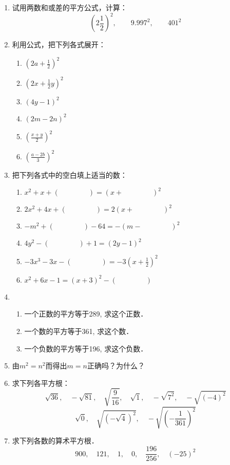 \begin{enumerate}
    \item 试用两数和或差的平方公式，计算：
\[\left(2\frac{1}{2}\right)^2,\qquad 9.997^2,\qquad 401^2\]
    \item 利用公式，把下列各式展开：
\begin{multicols}{2}
\begin{enumerate}
    \item $\left(2a+\frac{1}{2}\right)^2$
    \item $\left(2x+\frac{1}{2}y\right)^2$
    \item $(4y-1)^2$
    \item $(2m-2n)^2$
    \item $\left(\frac{x+y}{2}\right)^2$
    \item $\left(\frac{a-2b}{3}\right)^2$
\end{enumerate}
\end{multicols}
    \item 把下列各式中的空白填上适当的数：
\begin{enumerate}
    \item $x^2+x+(\qquad\qquad  )=(x+\qquad\qquad  )^2$
    \item $2x^2+4x+(\qquad\qquad   )=2(x+\qquad\qquad  )^2$
    \item $-m^2+(\qquad\qquad   )-64=-(m-\qquad\qquad  )^2$
    \item $4y^2-(\qquad\qquad  )+1=(2y-1)^2$
    \item $-3x^3-3x-(\qquad\qquad  )=-3\left(x+\frac{1}{2}\right)^2$
    \item $x^2+6x-1=(x+3)^2-(\qquad\qquad   )$
\end{enumerate}
    \item \begin{enumerate}
        \item 一个正数的平方等于289, 求这个正数．
        \item 一个数的平方等于361, 求这个数．
        \item 一个负数的平方等于196, 求这个负数．
    \end{enumerate}
    
\item 由$m^2=n^2$而得出$m=n$正确吗？为什么？
\item 求下列各平方根：
\[\sqrt{36},\quad -\sqrt{81},\quad \sqrt{\frac{9}{16}},\quad \sqrt{1},\quad -\sqrt{7^2},\quad -\sqrt{(-4)^2}\]
\[\sqrt{0},\quad \sqrt{(-\sqrt{4})^2},\quad -\sqrt{\left(-\frac{1}{361}\right)^2}\]
\item 求下列各数的算术平方根．
\[900,\quad 121,\quad 1,\quad 0,\quad \frac{196}{256},\quad (-25)^2\]


\end{enumerate}
